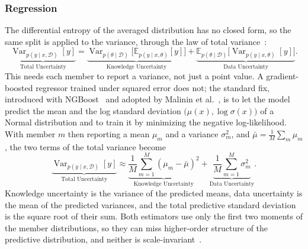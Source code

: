     \subsubsection{Regression}
        The differential entropy of the averaged distribution has no closed form, so
        the same split is applied to the variance, through the law of total
        variance~\cite{malinin2021}:
        \begin{equation}
            \underbrace{\operatorname{Var}_{p(y \mid x, \mathcal{D})}[y]}_{\text{Total Uncertainty}}
            =
            \underbrace{\operatorname{Var}_{p(\theta \mid \mathcal{D})}\!\bigl[ \mathbb{E}_{p(y \mid x, \theta)}[y] \bigr]}_{\text{Knowledge Uncertainty}}
            +
            \underbrace{\mathbb{E}_{p(\theta \mid \mathcal{D})}\!\bigl[ \operatorname{Var}_{p(y \mid x,\theta)}[y] \bigr]}_{\text{Data Uncertainty}} .
            \label{eq:bg:unc:totvar}
        \end{equation}
        This needs each member to report a variance, not just a point value. A
        gradient-boosted regressor trained under squared error does not; the standard
        fix, introduced with NGBoost~\cite{duan2020ngboost} and adopted by Malinin et
        al.~\cite{malinin2021}, is to let the model predict the mean and the log
        standard deviation $\bigl(\mu(x), \log \sigma(x)\bigr)$ of a Normal
        distribution and to train it by minimizing the negative log-likelihood. With
        member $m$ then reporting a mean $\mu_m$ and a variance $\sigma_m^2$, and
        $\bar\mu = \tfrac{1}{M}\sum_m \mu_m$, the two terms of the total variance
        become
        \begin{equation}
            \underbrace{\operatorname{Var}_{p(y \mid x,\mathcal{D})}[y]}_{\text{Total Uncertainty}} \approx
            \underbrace{\frac{1}{M} \sum_{m=1}^{M} (\mu_m - \bar\mu)^2}_{\text{Knowledge Uncertainty}}
            +
            \underbrace{\frac{1}{M} \sum_{m=1}^{M} \sigma_m^2}_{\text{Data Uncertainty}} .
            \label{eq:bg:unc:gaussvar}
        \end{equation}
        Knowledge uncertainty is the variance of the predicted means, data uncertainty
        is the mean of the predicted variances, and the total predictive standard
        deviation is the square root of their sum. Both estimators use only the first
        two moments of the member distributions, so they can miss higher-order
        structure of the predictive distribution, and neither is
        scale-invariant~\cite{malinin2021}.

